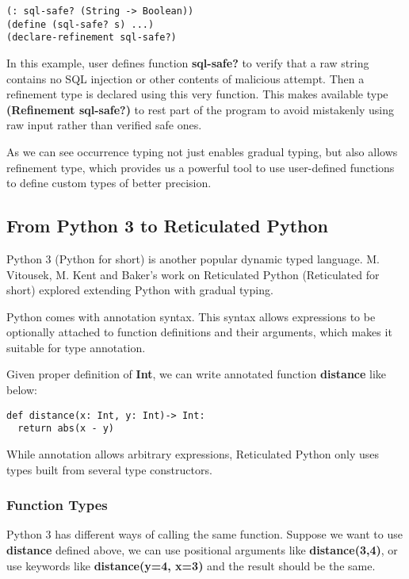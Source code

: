 \begin{verbatim}
(: sql-safe? (String -> Boolean))
(define (sql-safe? s) ...)
(declare-refinement sql-safe?)
\end{verbatim}

In this example, user defines function \textbf{sql-safe?} to verify
that a raw string contains no SQL injection or other contents of malicious attempt.
Then a refinement type is declared using this very function.
This makes available type \textbf{(Refinement sql-safe?)} to rest part of the program
to avoid mistakenly using raw input rather than verified safe ones.

As we can see occurrence typing not just enables
gradual typing, but also allows refinement type,
which provides us a powerful tool to use user-defined functions
to define custom types of better precision.

\subsection{From Python 3 to Reticulated Python}

Python 3 (Python for short) is another popular dynamic typed language.
M. Vitousek, M. Kent and Baker's work on Reticulated Python (Reticulated for short)
explored extending Python with gradual typing.

Python comes with annotation syntax.
This syntax allows expressions to be optionally attached to
function definitions and their arguments,
which makes it suitable for type annotation.

Given proper definition of \textbf{Int}, we can write annotated
function \textbf{distance} like below:

\begin{verbatim}
def distance(x: Int, y: Int)-> Int:
  return abs(x - y)
\end{verbatim}

While annotation allows arbitrary expressions, Reticulated Python
only uses types built from several type constructors.

\subsubsection{Function Types}

Python 3 has different ways of calling the same function.
Suppose we want to use \textbf{distance} defined above,
we can use positional arguments like \textbf{distance(3,4)},
or use keywords like \textbf{distance(y=4, x=3)} and the result should be the same.

